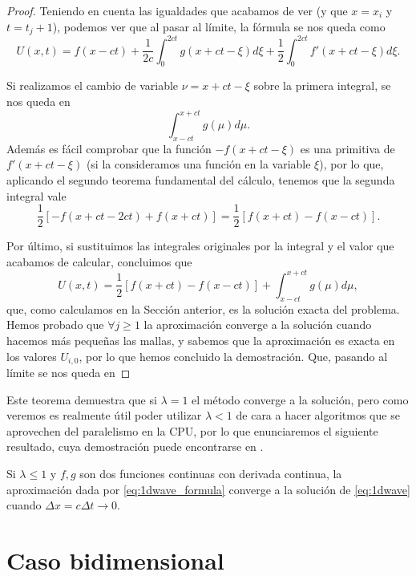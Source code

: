 \begin{proof}
	Teniendo en cuenta las igualdades que acabamos de ver (y  que $x=x_i$ y $t=t_j+1$), podemos ver que al pasar al límite, la fórmula se nos queda como
	\begin{equation}
		U(x,t) = f(x-ct) + \frac{1}{2c}\int_{0}^{2ct}g(x+ct-\xi)d\xi + \frac{1}{2}\int_{0}^{2ct} f'(x+ct-\xi)d\xi.
	\end{equation}

	Si realizamos el cambio de variable $\nu = x +ct - \xi$ sobre la primera integral, se nos queda en
	\begin{equation}
		\int_{x-ct}^{x+ct}g(\mu)d\mu.
	\end{equation}
	Además es fácil comprobar que la función $-f(x+ct-\xi)$ es una primitiva de $f'(x+ct-\xi)$ (si la consideramos una función en la variable $\xi$), por lo que, aplicando el segundo teorema fundamental del cálculo, tenemos que la segunda integral vale
	\begin{equation}
		\frac{1}{2}[-f(x+ct-2ct)+f(x+ct)] = \frac{1}{2}[f(x+ct)-f(x-ct)].
	\end{equation}
	
	Por último, si sustituimos las integrales originales por la integral y el valor que acabamos de calcular, concluimos que
	\begin{equation}
		U(x,t) = \frac{1}{2}[f(x+ct) - f(x-ct)] + \int_{x-ct}^{x+ct}g(\mu)d\mu,
	\end{equation}
	que, como calculamos en la Sección anterior, es la solución exacta del problema. Hemos probado que $\forall j\geq1$ la aproximación converge a la solución cuando hacemos más pequeñas las mallas, y sabemos que la aproximación es exacta en los valores $U_{i,0}$, por lo que hemos concluido la demostración.
	Que, pasando al límite se nos queda en
\end{proof}

	Este teorema demuestra que si $\lambda=1$ el método converge a la solución, pero como veremos es realmente útil poder utilizar $\lambda<1$ de cara a hacer algoritmos que se aprovechen del paralelismo en la CPU, por lo que enunciaremos el siguiente resultado, cuya demostración puede encontrarse en \cite{anummeth}.
	
	\begin{teorema}
		Si $\lambda\leq1$ y $f,g$ son dos funciones continuas con derivada continua, la aproximación dada por \eqref{eq:1dwave_formula} converge a la solución de \eqref{eq:1dwave} cuando $\Delta x = c\Delta t \longrightarrow 0$.
	\end{teorema}

\section{Caso bidimensional}


